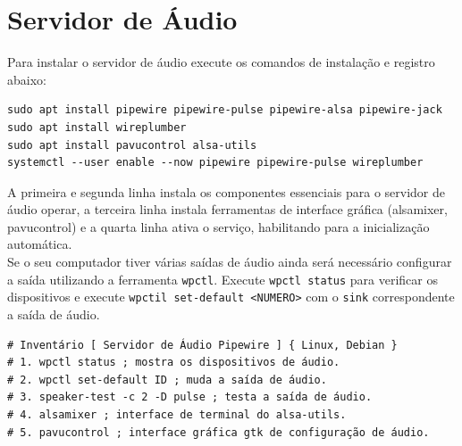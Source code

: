 \documentclass[12pt,a4paper]{article}
\begin{document}
\section{Servidor de Áudio}

\vspace{\baselineskip}

Para instalar o servidor de áudio execute os comandos de instalação e registro abaixo:\\

\begin{lstlisting}
sudo apt install pipewire pipewire-pulse pipewire-alsa pipewire-jack 
sudo apt install wireplumber
sudo apt install pavucontrol alsa-utils 
systemctl --user enable --now pipewire pipewire-pulse wireplumber
\end{lstlisting}

\vspace{\baselineskip}

A primeira e segunda linha instala os componentes essenciais para o servidor de áudio operar, a terceira linha instala ferramentas de interface gráfica (alsamixer, pavucontrol) e a quarta linha ativa o serviço, habilitando para a inicialização automática. \\

Se o seu computador tiver várias saídas de áudio ainda será necessário configurar a saída utilizando a ferramenta \texttt{wpctl}. Execute \texttt{wpctl status} para verificar os dispositivos e execute \texttt{wpctil set-default <NUMERO>} com o \texttt{sink} correspondente a saída de áudio. \\

\begin{lstlisting}
# Inventário [ Servidor de Áudio Pipewire ] { Linux, Debian }
# 1. wpctl status ; mostra os dispositivos de áudio.
# 2. wpctl set-default ID ; muda a saída de áudio.
# 3. speaker-test -c 2 -D pulse ; testa a saída de áudio.
# 4. alsamixer ; interface de terminal do alsa-utils.
# 5. pavucontrol ; interface gráfica gtk de configuração de áudio.
\end{lstlisting}


\end{document}
